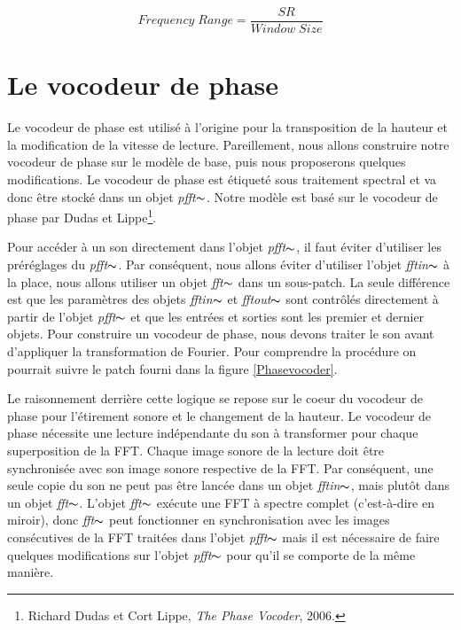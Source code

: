     \begin{equation*}
        Frequency \; Range = \frac{SR}{Window \; Size}
    \end{equation*}

\section{Le vocodeur de phase}

Le vocodeur de phase est utilisé à l'origine pour la transposition de la hauteur et la modification de la vitesse de lecture. Pareillement, nous allons construire notre vocodeur de phase sur le modèle de base, puis nous proposerons quelques modifications. Le vocodeur de phase est étiqueté sous traitement spectral et va donc être stocké dans un objet \textit{pfft}$\thicksim $. Notre modèle est basé sur le vocodeur de phase par Dudas et Lippe\footnote{Richard Dudas et Cort Lippe, \textit{The Phase Vocoder}, 2006. \nocite{DL07} \nocite{DL06}}.

Pour accéder à un son directement dans l’objet \textit{pfft}$\thicksim$, il faut éviter d'utiliser les préréglages du  \textit{pfft}$\thicksim $. Par conséquent, nous allons éviter d'utiliser l'objet \textit{fftin}$ \thicksim $ à la place, nous allons utiliser un objet \textit{fft}$\thicksim $ dans un sous-patch. La seule différence est que les paramètres des objets \textit{fftin}$\thicksim $ et \textit{fftout}$\thicksim$ sont contrôlés directement à partir de l'objet  \textit{pfft}$\thicksim $ et que les entrées et sorties sont les premier et dernier objets. Pour construire un vocodeur de phase, nous devons traiter le son avant d'appliquer la transformation de Fourier. Pour comprendre la procédure on pourrait suivre le patch fourni dans la figure \ref{Phasevocoder}.

Le raisonnement derrière cette logique se repose sur le coeur du vocodeur de phase pour l'étirement sonore et le changement de la hauteur. Le vocodeur de phase nécessite une lecture indépendante du son à transformer pour chaque superposition de la FFT. Chaque image sonore de la lecture doit être synchronisée avec son image sonore respective de la FFT. Par conséquent, une seule copie du son ne peut pas être lancée dans un objet \textit{fftin}$\thicksim$, mais plutôt dans un objet \textit{fft}$\thicksim$. L'objet \textit{fft}$\thicksim$ exécute une FFT à spectre complet (c'est-à-dire en miroir), donc \textit{fft}$\thicksim$ peut fonctionner en synchronisation avec les images consécutives de la FFT traitées dans l'objet \textit{pfft}$\thicksim$ mais il est nécessaire de faire quelques modifications sur l'objet \textit{pfft}$\thicksim$ pour qu'il se comporte de la même manière.

